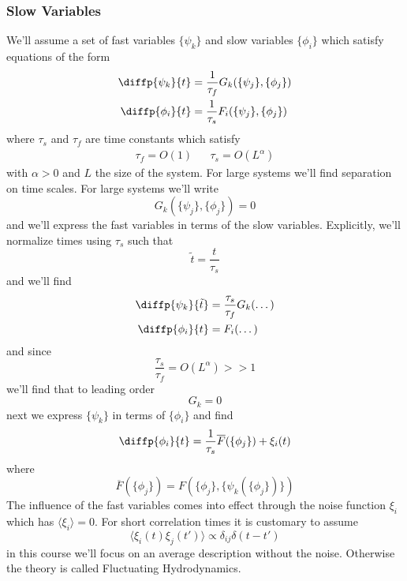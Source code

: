 \subsubsection{Slow Variables}
We'll assume a set of fast variables $\{\psi_k\}$ and slow variables $\{\phi_i\}$ which satisfy equations of the form
\begin{align}
	\diffp{\psi_k}{t} &= \frac{1}{\tau_f}G_k(\{\psi_j\}, \{\phi_j\})\\
	\diffp{\phi_i}{t} &= \frac{1}{\tau_s}F_i(\{\psi_j\},\{\phi_j\})
\end{align}
where $\tau_s$ and $\tau_f$ are time constants which satisfy
\begin{align}
	\tau_f = O(1) && \tau_s = O(L^\alpha)
\end{align}
with $\alpha>0$ and $L$ the size of the system. For large systems we'll find separation on time scales. For large systems we'll write
\begin{equation}
	G_k(\{\psi_j\}, \{\phi_j\}) = 0
\end{equation}
and we'll express the fast variables in terms of the slow variables. Explicitly, we'll normalize times using $\tau_s$ such that
\begin{equation}
	\tilde t = \frac{t}{\tau_s}
\end{equation}
and we'll find
\begin{align}
	\diffp{\psi_k}{\tilde t} &= \frac{\tau_s}{\tau_f}G_k(\dots)\\
	\diffp{\phi_i}{t} &= F_i(\dots)
\end{align}
and since
\begin{equation}
	\frac{\tau_s}{\tau_f} = O(L^\alpha)>>1
\end{equation}
we'll find that to leading order
\begin{equation}
	G_k=0
\end{equation}
next we express $\{\psi_k\}$ in terms of $\{\phi_i\}$ and find
\begin{equation}
	\diffp{\phi_i}{t} = \frac{1}{\tau_s}\overline{F}(\{\phi_j\}) + \xi_i(t)
\end{equation}
where
\begin{equation}
	\overline{F}(\{\phi_j\}) = F(\{\phi_j\}, \{\psi_k(\{\phi_j\})\})
\end{equation}
The influence of the fast variables comes into effect through the noise function $\xi_i$ which has $\langle\xi_i\rangle=0$. For short correlation times it is customary to assume
\begin{equation}
	\langle\xi_i(t)\xi_j(t')\rangle \propto \delta_{ij}\delta(t-t')
\end{equation}
in this course we'll focus on an average description without the noise. Otherwise the theory is called Fluctuating Hydrodynamics.
